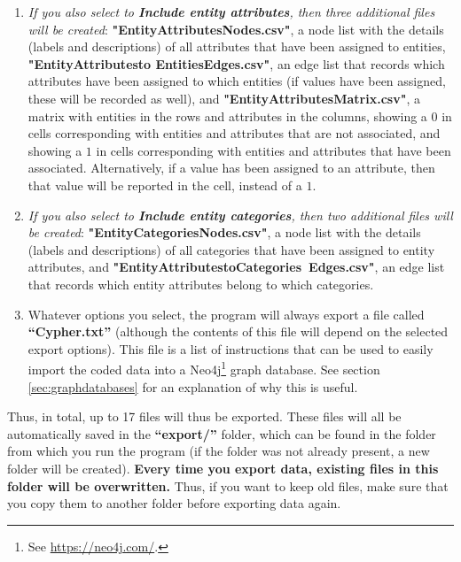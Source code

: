 \documentclass{memoir}
\begin{document}
\begin{enumerate}
\item{\emph{If you also select to \textbf{Include entity attributes}, then three additional files will be created}: \textbf{"Entity\textunderscore Attributes\textunderscore Nodes.csv"}, a node list with the details (labels and descriptions) of all attributes that have been assigned to entities, \textbf{"Entity\textunderscore Attributes\textunderscore to \textunderscore Entities\textunderscore Edges.csv"}, an edge list that records which attributes have been assigned to which entities (if values have been assigned, these will be recorded as well), and \textbf{"Entity\textunderscore Attributes\textunderscore Matrix.csv"}, a matrix with entities in the rows and attributes in the columns, showing a \(0\) in cells corresponding with entities and attributes that are not associated, and showing a \(1\) in cells corresponding with entities and attributes that have been associated. Alternatively, if a value has been assigned to an attribute, then that value will be reported in the cell, instead of a \(1\).}
\item{\emph{If you also select to \textbf{Include entity categories}, then two additional files will be created}: \textbf{"Entity\textunderscore Categories\textunderscore Nodes.csv"}, a node list with the details (labels and descriptions) of all categories that have been assigned to entity attributes, and \textbf{"Entity\textunderscore Attributes\textunderscore to\textunderscore Categories\textunderscore \ Edges.csv"}, an edge list that records which entity attributes belong to which categories.}
\item{Whatever options you select, the program will always export a file called \textbf{``Cypher.txt''} (although the contents of this file will depend on the selected export options). This file is a list of instructions that can be used to easily import the coded data into a Neo4j\footnote{See \url{https://neo4j.com/}.} graph database. See section \ref{sec:graphdatabases} for an explanation of why this is useful.}
\end{enumerate}

Thus, in total, up to 17 files will thus be exported. These files will all be automatically saved in the \textbf{``export/''} folder, which can be found in the folder from which you run the program (if the folder was not already present, a new folder will be created). \textbf{Every time you export data, existing files in this folder will be overwritten.} Thus, if you want to keep old files, make sure that you copy them to another folder before exporting data again.
\end{document}
